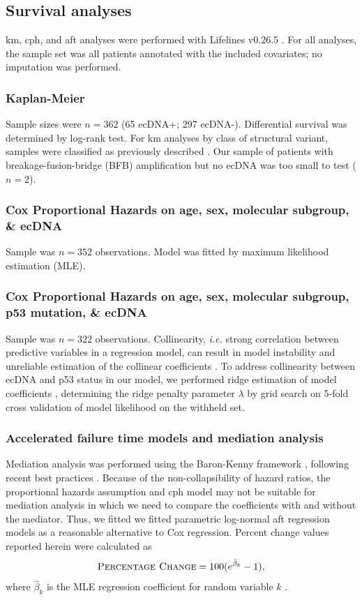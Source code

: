 \subsection{Survival analyses}
\acrfull{km}, \acrfull{cph}, and \acrfull{aft} analyses were performed with Lifelines v0.26.5 \cite{lifelines}. For all analyses, the sample set was all patients annotated with the included covariates; no imputation was performed. 
\subsubsection{Kaplan-Meier} Sample sizes were $n = 362$ (65 ecDNA+; 297 ecDNA-). Differential survival was determined by log-rank test. For \acrshort{km} analyses by class of structural variant, samples were classified as previously described \cite{Kim_2020}. Our sample of patients with breakage-fusion-bridge (BFB) amplification but no ecDNA was too small to test ($n=2$).
\subsubsection{Cox Proportional Hazards on age, sex, molecular subgroup, \& ecDNA} Sample was $n = 352$ observations. Model was fitted by maximum likelihood estimation (MLE).
\subsubsection{Cox Proportional Hazards on age, sex, molecular subgroup, p53 mutation, \& ecDNA} Sample was $n = 322$ observations. Collinearity, \textit{i.e.} strong correlation between predictive variables in a regression model, can result in model instability and unreliable estimation of the collinear coefficients \cite{liu_2017}. To address collinearity between ecDNA and p53 status in our model, we performed ridge estimation of model coefficients \cite{verweij_1994, xue_2007}, determining the ridge penalty parameter $\lambda$ by grid search on 5-fold cross validation of model likelihood on the withheld set.
\subsubsection{Accelerated failure time models and mediation analysis} Mediation analysis was performed using the Baron-Kenny framework \cite{baron-kenny_1986}, following recent best practices \cite{lapointe_2018}. Because of the non-collapsibility of hazard ratios, the proportional hazards assumption and \acrshort{cph} model may not be suitable for mediation analysis in which we need to compare the coefficients with and without the mediator. Thus, we fitted we fitted parametric log-normal \acrshort{aft} regression models as a reasonable alternative to Cox regression. Percent change values reported herein were calculated as
$$\textsc{Percentage Change}=100(e^{\hat{\beta}_k}-1),$$
 where  $\hat{\beta}_k$ is the MLE regression coefficient for random variable $k$ \cite{demeritt_2022}. 

